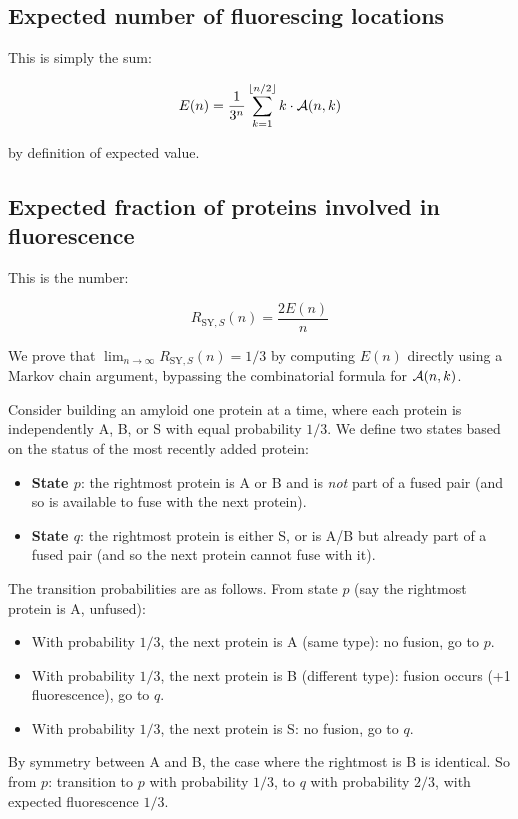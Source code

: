 \documentclass[11pt]{article}
\DeclarePairedDelimiter\floor{\lfloor}{\rfloor}
\newcommand{\cA}{ {\cal A} }
\begin{document}
\subsection{Expected number of fluorescing locations}

This is simply the sum:

\[
    E(n) = \frac{1}{3^n}\sum_{k=1}^{\floor{n/2}} k \cdot \cA(n,k)
\]

by definition of expected value.

\subsection{Expected fraction of proteins involved in fluorescence}\label{subsec:s3-Eq}

This is the number:

\[
    R_{\text{SY},S}(n) = \frac{2E(n)}{n}
\]

We prove that $\lim_{n \to \infty} R_{\text{SY},S}(n) = 1/3$ by computing $E(n)$ directly using a Markov chain argument, bypassing the combinatorial formula for $\cA(n,k)$.

Consider building an amyloid one protein at a time, where each protein is independently A, B, or S with equal probability $1/3$. We define two states based on the status of the most recently added protein:
\begin{itemize}
\item \textbf{State $p$}: the rightmost protein is A or B and is \textit{not} part of a fused pair (and so is available to fuse with the next protein).
\item \textbf{State $q$}: the rightmost protein is either S, or is A/B but already part of a fused pair (and so the next protein cannot fuse with it).
\end{itemize}

The transition probabilities are as follows. From state $p$ (say the rightmost protein is A, unfused):
\begin{itemize}
\item With probability $1/3$, the next protein is A (same type): no fusion, go to $p$.
\item With probability $1/3$, the next protein is B (different type): fusion occurs (+1 fluorescence), go to $q$.
\item With probability $1/3$, the next protein is S: no fusion, go to $q$.
\end{itemize}
By symmetry between A and B, the case where the rightmost is B is identical. So from $p$: transition to $p$ with probability $1/3$, to $q$ with probability $2/3$, with expected fluorescence $1/3$.
\end{document}
